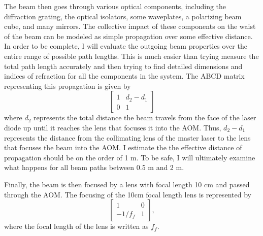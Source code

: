 The beam then goes through various optical components, including the diffraction grating, the optical isolators, some waveplates, a polarizing beam cube, and many mirrors. The collective impact of these components on the waist of the beam can be modeled as simple propagation over some effective distance. %
In order to be complete, I will evaluate the outgoing beam properties over the entire range of possible path lengths. This is much easier than trying measure the total path length accurately and then trying to find detailed dimensions and indices of refraction for all the components in the system. The ABCD matrix representing this propagation is given by
\begin{equation}
\begin{bmatrix}\label{ABCD3}
1 & d_2-d_1 \\ 0 & 1
\end{bmatrix}
\end{equation}
where $d_2$ represents the total distance the beam travels from the face of the laser diode up until it reaches the lens that focuses it into the AOM. Thus, $d_2-d_1$ represents the distance from the collimating lens of the master laser to the lens that focuses the beam into the AOM. 
I estimate the the effective distance of propagation should be on the order of 1 m. To be safe, I will ultimately examine what happens for all beam paths between 0.5 m and 2 m. 

Finally, the beam is then focused by a lens with focal length 10 cm and passed through the AOM. The focusing of the 10cm focal length lens is represented by
\begin{equation}
\begin{bmatrix}\label{ABCD4}
1 & 0 \\ -1/f_{f} & 1
\end{bmatrix},
\end{equation} 
where the focal length of the lens is written as $f_{f}$.

